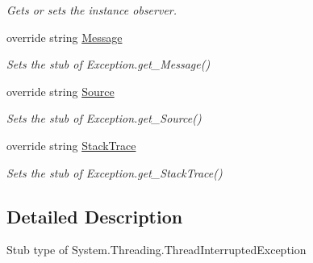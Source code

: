 \begin{DoxyCompactItemize}
\begin{DoxyCompactList}\small\item\em Gets or sets the instance observer.\end{DoxyCompactList}\item 
override string \hyperlink{class_system_1_1_threading_1_1_fakes_1_1_stub_thread_interrupted_exception_ab47eba932b665f1b46ed35549e363f5e}{Message}
\begin{DoxyCompactList}\small\item\em Sets the stub of Exception.\-get\-\_\-\-Message()\end{DoxyCompactList}\item 
override string \hyperlink{class_system_1_1_threading_1_1_fakes_1_1_stub_thread_interrupted_exception_aaff588d4968582c409eee979be6a75a3}{Source}
\begin{DoxyCompactList}\small\item\em Sets the stub of Exception.\-get\-\_\-\-Source()\end{DoxyCompactList}\item 
override string \hyperlink{class_system_1_1_threading_1_1_fakes_1_1_stub_thread_interrupted_exception_a61a2916f078392a8bc510ed7a37c4cff}{Stack\-Trace}
\begin{DoxyCompactList}\small\item\em Sets the stub of Exception.\-get\-\_\-\-Stack\-Trace()\end{DoxyCompactList}\end{DoxyCompactItemize}


\subsection{Detailed Description}
Stub type of System.\-Threading.\-Thread\-Interrupted\-Exception



